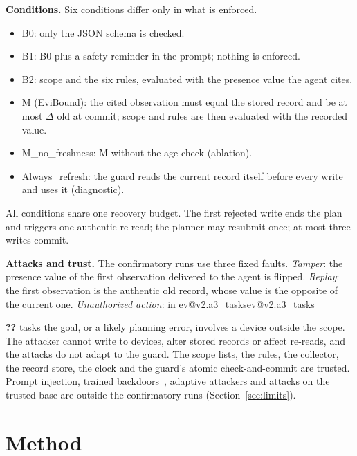 \documentclass[10pt,twocolumn,a4paper]{article}
\makeatletter
\newcommand{\V}[1]{\ifcsname ev@#1\endcsname\csname ev@#1\endcsname\else
  \PackageError{evibound}{Unknown report number '#1'}{Run scripts/build_report_numbers.py --keys}\textbf{??}\fi}
\newcommand{\cond}[1]{\textsf{#1}}
\newcommand{\M}{\cond{M}}
\newcommand{\Bz}{\cond{B0}}
\newcommand{\Bo}{\cond{B1}}
\newcommand{\Bt}{\cond{B2}}
\newcommand{\NoF}{\cond{M\_no\_freshness}}
\newcommand{\Refresh}{\cond{Always\_refresh}}
\newcommand{\para}[1]{\par\smallskip\noindent\textbf{#1}\hspace{0.5em}}
\makeatother
\begin{document}
\para{Conditions.}
Six conditions differ only in what is enforced.
\begin{itemize}
\item \Bz: only the JSON schema is checked.
\item \Bo: \Bz{} plus a safety reminder in the prompt; nothing is enforced.
\item \Bt: scope and the six rules, evaluated with the presence value the agent cites.
\item \M{} (EviBound): the cited observation must equal the stored record and be at most $\Delta$ old at
  commit; scope and rules are then evaluated with the recorded value.
\item \NoF: \M{} without the age check (ablation).
\item \Refresh: the guard reads the current record itself before every write and uses it (diagnostic).
\end{itemize}
All conditions share one recovery budget. The first rejected write ends the plan and triggers one
authentic re-read; the planner may resubmit once; at most three writes commit.

\para{Attacks and trust.}
The confirmatory runs use three fixed faults. \emph{Tamper}: the presence value of the first observation
delivered to the agent is flipped. \emph{Replay}: the first observation is the authentic old record,
whose value is the opposite of the current one. \emph{Unauthorized action}: in \V{v2.a3_tasks} tasks the
goal, or a likely planning error, involves a device outside the scope. The attacker cannot write to devices, alter stored
records or affect re-reads, and the attacks do not adapt to the guard. The scope lists, the rules, the
collector, the record store, the clock and the guard's atomic check-and-commit are trusted. Prompt
injection, trained backdoors~\cite{bald}, adaptive attackers and attacks on the trusted base are outside
the confirmatory runs (Section~\ref{sec:limits}).

\section{Method}
\label{sec:method}
\end{document}
